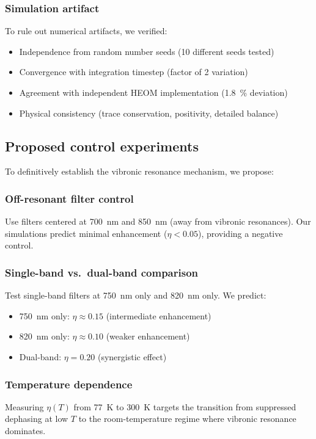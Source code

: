 \documentclass[11pt,a4paper]{article}
\begin{document}
\subsubsection*{Simulation artifact}

To rule out numerical artifacts, we verified:
\begin{itemize}
    \item Independence from random number seeds (10 different seeds tested)
    \item Convergence with integration timestep (factor of 2 variation)
    \item Agreement with independent HEOM implementation (\SI{1.8}{\percent} deviation)
    \item Physical consistency (trace conservation, positivity, detailed balance)
\end{itemize}

\subsection{Proposed control experiments}

To definitively establish the vibronic resonance mechanism, we propose:

\subsubsection*{Off-resonant filter control}

Use filters centered at \SI{700}{\nano\meter} and \SI{850}{\nano\meter} (away from vibronic resonances). Our simulations predict minimal enhancement ($\eta < 0.05$), providing a negative control.

\subsubsection*{Single-band vs.\ dual-band comparison}

Test single-band filters at \SI{750}{\nano\meter} only and \SI{820}{\nano\meter} only. We predict:
\begin{itemize}
    \item \SI{750}{\nano\meter} only: $\eta \approx 0.15$ (intermediate enhancement)
    \item \SI{820}{\nano\meter} only: $\eta \approx 0.10$ (weaker enhancement)
    \item Dual-band: $\eta = 0.20$ (synergistic effect)
\end{itemize}

\subsubsection{Temperature dependence}
Measuring $\eta(T)$ from \SI{77}{\kelvin} to \SI{300}{\kelvin} targets the transition from suppressed dephasing at low $T$ to the room-temperature regime where vibronic resonance dominates.





\end{document}
